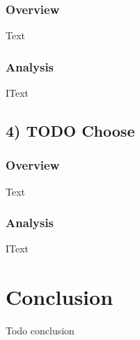\documentclass[h]{article}
\begin{document}
\subsubsection*{Overview}
Text

\subsubsection*{Analysis}
IText

\subsection*{4) TODO Choose}  
\subsubsection*{Overview}
Text

\subsubsection*{Analysis}
IText


\section*{Conclusion}  
Todo conclusion
\end{document}
